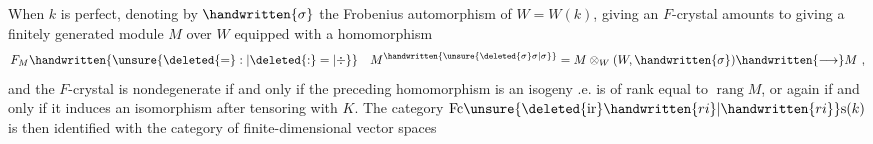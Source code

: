  When $k$ is perfect, denoting by $\handwritten{\sigma}$ the Frobenius automorphism of $W=W(k)$, giving an $F$-crystal amounts to giving a finitely generated module $M$ over $W$ equipped with a homomorphism
\[
F_M\handwritten{\unsure{\deleted{=}:|\deleted{:}=|\div}}\quad M^{\handwritten{\unsure{\deleted{\sigma}\sigma|\sigma}}}=M\otimes_W(W,\handwritten{\sigma})\handwritten{\longrightarrow}M\ ,
\]
and the $F$-crystal is nondegenerate if and only if the preceding homomorphism is an isogeny .e. is of rank equal to $\operatorname{rang}M$, or again if and only if it induces an isomorphism after tensoring with $K$. The category  $\mathrm{Fc}\unsure{\deleted{\mathrm{ir}}\handwritten{ri}|\handwritten{ri}}\mathrm{s}(k)$ is then identified with the category of finite-dimensional vector spaces
